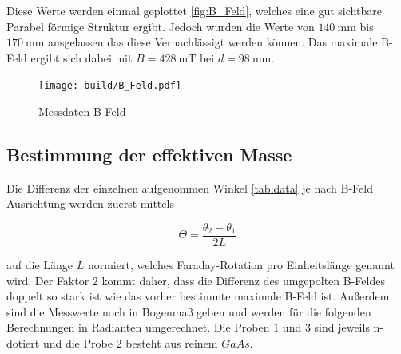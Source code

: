Diese Werte werden einmal geplottet \eqref{fig:B_Feld}, welches eine gut sichtbare Parabel förmige Struktur ergibt. 
Jedoch wurden die Werte von $\qty{140}{\milli\meter}$ bis $\qty{170}{\milli\meter}$ ausgelassen das diese Vernachlässigt werden können. 
Das maximale B-Feld ergibt sich dabei mit $B=\qty{428}{\milli\tesla}$ bei $d=\qty{98}{\milli\meter}$. 

\begin{figure}[H]
	\centering
	\texttt{[image: build/B\_Feld.pdf]}
	\caption{Messdaten B-Feld}\label{fig:B_Feld}
\end{figure}

\subsection{Bestimmung der effektiven Masse}
Die Differenz der einzelnen aufgenommen Winkel \eqref{tab:data} je nach B-Feld Ausrichtung werden zuerst mittels 

\begin{equation}
    \Theta =\frac{\theta_2 - \theta_1}{2L} 
\end{equation}

auf die Länge $L$ normiert, welches Faraday-Rotation pro Einheitslänge genannt wird.  
Der Faktor $2$ kommt daher, dass die Differenz des umgepolten B-Feldes doppelt so stark ist wie das vorher bestimmte maximale B-Feld ist. 
Außerdem sind die Messwerte noch in Bogenmaß geben und werden für die folgenden Berechnungen in Radianten umgerechnet. 
Die Proben $1$ und $3$ sind jeweils n-dotiert und die Probe 2 besteht aus reinem $GaAs$. 

